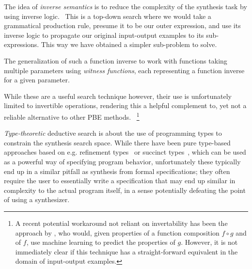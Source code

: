 \documentclass{article}
\begin{document}

The idea of \emph{inverse semantics} is to reduce the complexity
of the synthesis task by using inverse logic.~\citep{flashmeta,prose}
This is a top-down search where we would take a grammatical
production rule, presume it to be our outer expression,
and use its inverse logic to propagate our original
input-output examples to its sub-expressions.
This way we have obtained a simpler sub-problem to solve.

The generalization of such a function inverse to work with functions
taking multiple parameters using \emph{witness functions},
each representing a function inverse for a given parameter.

While these are a useful search technique however, their
use is unfortunately limited to invertible operations,
rendering this a helpful complement to, yet not a
reliable alternative to other PBE methods.%
~\footnote{
    A recent potential workaround not reliant on invertability
    has been the approach by \citet{odena2020learning},
    who would, given properties of a function composition
    $f \circ g$ and of $f$, use machine learning to predict
    the properties of $g$.
    However, it is not immediately clear if this technique
    has a straight-forward equivalent in the domain of
    input-output examples.
}


\emph{Type-theoretic} deductive search is about the use of programming
types to constrain the synthesis search space.
While there have been pure type-based approaches based on e.g.
refinement types~\citep{synquid} or succinct types~\citep{guospeeding},
which can be used as a powerful way of specifying program behavior,
unfortunately these typically end up in a similar pitfall as
synthesis from formal specifications;
they often require the user to essentially write a specification
that may end up similar in complexity to the actual program itself,
in a sense potentially defeating the point of using a synthesizer.

\end{document}
